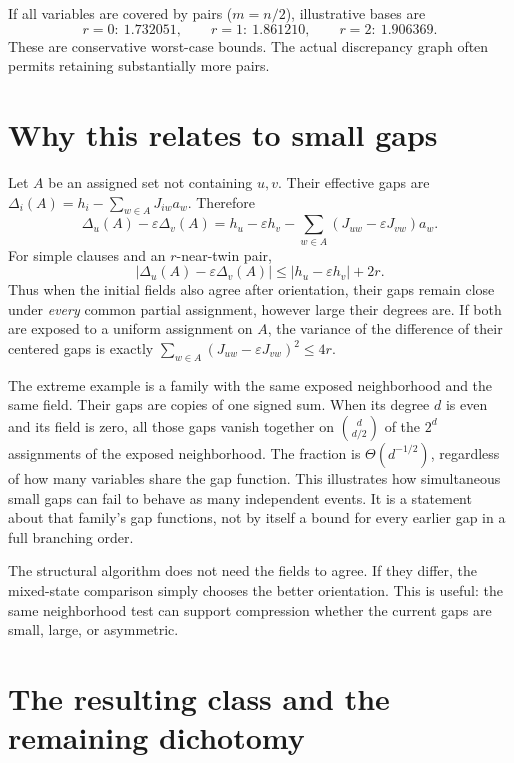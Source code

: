 \documentclass[11pt,a4paper]{article}
\begin{document}
If all variables are covered by pairs ($m=n/2$), illustrative bases are
\[
 r=0:\ 1.732051,\qquad
 r=1:\ 1.861210,\qquad
 r=2:\ 1.906369.
\]
These are conservative worst-case bounds. The actual discrepancy graph
often permits retaining substantially more pairs.

\section{Why this relates to small gaps}

Let $A$ be an assigned set not containing $u,v$. Their effective gaps
are $\Delta_i(A)=h_i-\sum_{w\in A}J_{iw}a_w$. Therefore
\begin{equation}
 \Delta_u(A)-\varepsilon\Delta_v(A)
 =h_u-\varepsilon h_v
  -\sum_{w\in A}(J_{uw}-\varepsilon J_{vw})a_w.       \label{eq:coupled}
\end{equation}
For simple clauses and an $r$-near-twin pair,
\[
 |\Delta_u(A)-\varepsilon\Delta_v(A)|
 \le |h_u-\varepsilon h_v|+2r.
\]
Thus when the initial fields also agree after orientation, their gaps
remain close under \emph{every} common partial assignment, however large
their degrees are. If both are exposed to a uniform assignment on $A$,
the variance of the difference of their centered gaps is exactly
$\sum_{w\in A}(J_{uw}-\varepsilon J_{vw})^2\le4r$.

The extreme example is a family with the same exposed neighborhood and
the same field. Their gaps are copies of one signed sum. When its degree
$d$ is even and its field is zero, all those gaps vanish together on
$\binom d{d/2}$ of the $2^d$ assignments of the exposed neighborhood.
The fraction is $\Theta(d^{-1/2})$, regardless of how many variables
share the gap function. This illustrates how simultaneous small gaps
can fail to behave as many independent events. It is a statement about
that family's gap functions, not by itself a bound for every earlier
gap in a full branching order.

The structural algorithm does not need the fields to agree. If they
differ, the mixed-state comparison simply chooses the better orientation.
This is useful: the same neighborhood test can support compression
whether the current gaps are small, large, or asymmetric.

\section{The resulting class and the remaining dichotomy}
\end{document}
